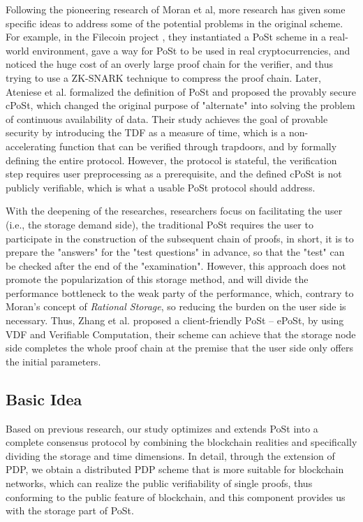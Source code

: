 \documentclass[journal]{IEEEtran}
\begin{document}
Following the pioneering research of Moran et al, more research has given some specific ideas to address some of the potential problems in the original scheme. For example, in the Filecoin project \cite{2020filecoin}, they instantiated a PoSt scheme in a real-world environment, gave a way for PoSt to be used in real cryptocurrencies, and noticed the huge cost of an overly large proof chain for the verifier, and thus trying to use a ZK-SNARK technique \cite{2012zksnark, 2016groth16} to compress the proof chain. Later, Ateniese et al. formalized the definition of PoSt and proposed the provably secure cPoSt\cite{2020cpost}, which changed the original purpose of "alternate" into solving the problem of continuous availability of data. Their study achieves the goal of provable security by introducing the TDF\cite{2018vdf} as a measure of time, which is a non-accelerating function that can be verified through trapdoors, and by formally defining the entire protocol. However, the protocol is stateful, the verification step requires user preprocessing as a prerequisite, and the defined cPoSt is not publicly verifiable, which is what a usable PoSt protocol should address.


With the deepening of the researches, researchers focus on facilitating the user (i.e., the storage demand side), the traditional PoSt requires the user to participate in the construction of the subsequent chain of proofs, in short, it is to prepare the "answers" for the "test questions" in advance, so that the "test" can be checked after the end of the "examination". However, this approach does not promote the popularization of this storage method, and will divide the performance bottleneck to the weak party of the performance, which, contrary to Moran's concept of \textit{Rational Storage}\cite{2019pospacetime}, so reducing the burden on the user side is necessary. Thus, Zhang et al. proposed a client-friendly PoSt -- ePoSt\cite{2023epost}, by using VDF and Verifiable Computation, their scheme can achieve that the storage node side completes the whole proof chain at the premise that the user side only offers the initial parameters.

 
\subsection{Basic Idea}
Based on previous research, our study optimizes and extends PoSt into a complete consensus protocol by combining the blockchain realities and specifically dividing the storage and time dimensions. In detail, through the extension of PDP\cite{2007pdp}, we obtain a distributed PDP scheme that is more suitable for blockchain networks, which can realize the public verifiability of single proofs, thus conforming to the public feature of blockchain, and this component provides us with the storage part of PoSt.
\end{document}
